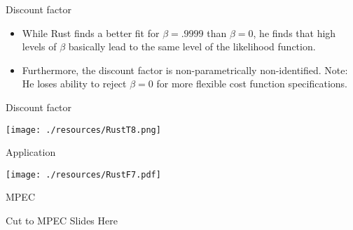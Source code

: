 \documentclass[xcolor=pdftex,dvipsnames,table,mathserif,aspectratio=169]{beamer}
\begin{document}
\begin{frame}{Discount factor}
\begin{itemize}
	\item While Rust finds a better fit for $\beta=.9999$ than $\beta=0$, he finds that high levels
	of $\beta$ basically lead to the same level of the likelihood function.

	\medskip
	\item Furthermore, the discount factor is non-parametrically non-identified. Note:
	He loses ability to reject $\beta=0$ for more flexible cost function specifications.

\end{itemize}
\end{frame}


\begin{frame}{Discount factor}
\begin{center}
\texttt{[image: ./resources/RustT8.png]}
\end{center}
\end{frame}

\begin{frame}{Application}
\begin{center}
\texttt{[image: ./resources/RustF7.pdf]}
\end{center}
\end{frame}

\begin{frame}{MPEC}
\begin{center}
Cut to MPEC Slides Here
\end{center}
\end{frame}
\end{document}
